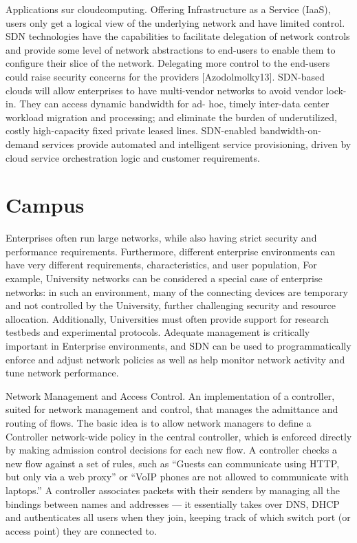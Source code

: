 Applications sur \gls{cloudcomputing}. Offering Infrastructure as a Service (IaaS), users only get a logical view of the underlying network and have limited control. SDN technologies have the capabilities to facilitate delegation of network controls and provide some level of network abstractions to end-users to enable them to configure their slice of the network. Delegating more control to the end-users could raise security concerns for the providers [Azodolmolky13]. SDN-based clouds will allow enterprises to have multi-vendor networks to avoid vendor lock-in. They can access dynamic bandwidth for ad- hoc, timely inter-data center workload migration and processing; and eliminate the burden of underutilized, costly high-capacity fixed private leased lines. SDN-enabled bandwidth-on-demand services provide automated and intelligent service provisioning, driven by cloud service orchestration logic and customer requirements.



\section{Campus}

Enterprises often run large networks, while also having strict security and performance requirements. Furthermore, different
enterprise environments can have very different requirements, characteristics, and user population, For example, University networks can be considered a special case of enterprise networks: in such an environment, many of the connecting devices are temporary and not controlled by the University, further challenging security and resource allocation. Additionally, Universities must often provide support for research testbeds and experimental protocols. Adequate management is critically important in Enterprise environments, and SDN can be used to programmatically enforce and adjust network policies as well as help monitor network activity and tune network performance.

Network Management and Access Control. An implementation of a controller, suited for network management and control, that manages the admittance and routing of flows. The basic idea is to allow network managers to define a Controller network-wide policy in the central controller, which is enforced directly by making admission control decisions for each new flow. A controller checks a new flow against a set of rules, such as “Guests can communicate using HTTP, but only via a web proxy” or “VoIP phones are not allowed to communicate with laptops.” A controller associates packets with their senders by managing all the bindings between names and addresses — it essentially takes over DNS, DHCP and authenticates all users when they join, keeping track of which switch port (or access point) they are connected to.

